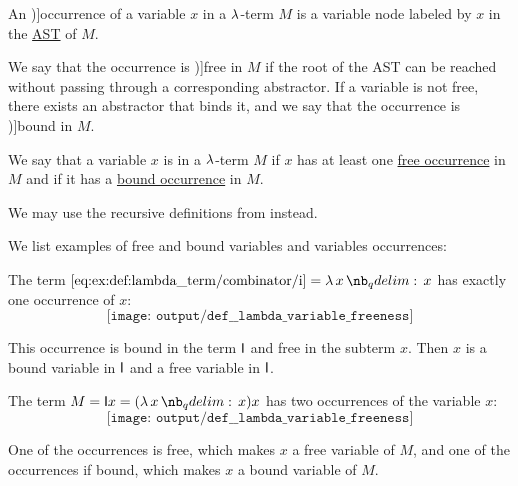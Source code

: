 \begin{definition}\label{def:lambda_variable_occurrence}\mimprovised
  An \term[ru=вхождение (\cite[64]{Герасимов2011})]{occurrence} of a variable \( x \) in a \( \mathrm{\lambda} \)-term \( M \) is a variable node labeled by \( x \) in the \hyperref[def:lambda_term_ast]{AST} of \( M \).

  We say that the occurrence is \term[ru=свободное (вхождение) (\cite[64]{Герасимов2011})]{free} in \( M \) if the root of the AST can be reached without passing through a corresponding abstractor. If a variable is not free, there exists an abstractor that binds it, and we say that the occurrence is \term[ru=связанное (вхождение) (\cite[64]{Герасимов2011})]{bound} in \( M \).
\end{definition}

\begin{definition}\label{def:lambda_variable_freeness}\mimprovised
  We say that a variable \( x \) is  in a \( \mathrm{\lambda} \)-term \( M \) if \( x \) has at least one \hyperref[def:lambda_variable_occurrence]{free occurrence} in \( M \) and  if it has a \hyperref[def:lambda_variable_occurrence]{bound occurrence} in \( M \).
\end{definition}
\begin{comments}
  \item We may use the recursive definitions from  instead.
\end{comments}

\begin{example}\label{ex:def:lambda_variable_freeness}
  We list examples of free and bound variables and variables occurrences:
  \begin{thmenum}
     The term \( \ref{eq:ex:def:lambda_term/combinator/i} = \qabs x x \) has exactly one occurrence of \( x \):
    \begin{equation*}
      \texttt{[image: output/def\_\_lambda\_variable\_freeness]}
    \end{equation*}

     This occurrence is bound in the term \( \textsf{I} \) and free in the subterm \( x \). Then \( x \) is a bound variable in \( \textsf{I} \) and a free variable in \( \textsf{I} \).

     The term \( M = \logic{I} x = (\qabs x x) x \) has two occurrences of the variable \( x \):
    \begin{equation*}
      \texttt{[image: output/def\_\_lambda\_variable\_freeness]}
    \end{equation*}

    One of the occurrences is free, which makes \( x \) a free variable of \( M \), and one of the occurrences if bound, which makes \( x \) a bound variable of \( M \).
  \end{thmenum}
\end{example}


